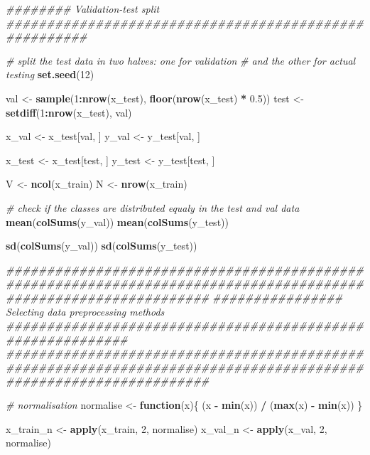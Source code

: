 \documentclass[]{article}
\newenvironment{Shaded}{\begin{snugshade}}{\end{snugshade}}
\newcommand{\CommentTok}[1]{\textcolor[rgb]{0.56,0.35,0.01}{\textit{#1}}}
\newcommand{\ControlFlowTok}[1]{\textcolor[rgb]{0.13,0.29,0.53}{\textbf{#1}}}
\newcommand{\DecValTok}[1]{\textcolor[rgb]{0.00,0.00,0.81}{#1}}
\newcommand{\FloatTok}[1]{\textcolor[rgb]{0.00,0.00,0.81}{#1}}
\newcommand{\KeywordTok}[1]{\textcolor[rgb]{0.13,0.29,0.53}{\textbf{#1}}}
\newcommand{\NormalTok}[1]{#1}
\newcommand{\OperatorTok}[1]{\textcolor[rgb]{0.81,0.36,0.00}{\textbf{#1}}}
\newcommand{\StringTok}[1]{\textcolor[rgb]{0.31,0.60,0.02}{#1}}
\begin{document}
\begin{Shaded}
\begin{Highlighting}[]
{\CommentTok{######## Validation-test split ######################################################}

\CommentTok{# split the test data in two halves: one for validation}
\CommentTok{# and the other for actual testing}
\KeywordTok{set.seed}\NormalTok{(}\DecValTok{12}\NormalTok{)}

\NormalTok{val <-}\StringTok{ }\KeywordTok{sample}\NormalTok{(}\DecValTok{1}\OperatorTok{:}\KeywordTok{nrow}\NormalTok{(x_test), }\KeywordTok{floor}\NormalTok{(}\KeywordTok{nrow}\NormalTok{(x_test) }\OperatorTok{*}\StringTok{ }\FloatTok{0.5}\NormalTok{)) }
\NormalTok{test <-}\StringTok{ }\KeywordTok{setdiff}\NormalTok{(}\DecValTok{1}\OperatorTok{:}\KeywordTok{nrow}\NormalTok{(x_test), val) }

\NormalTok{x_val <-}\StringTok{ }\NormalTok{x_test[val, ]}
\NormalTok{y_val <-}\StringTok{ }\NormalTok{y_test[val, ]}

\NormalTok{x_test <-}\StringTok{ }\NormalTok{x_test[test, ]}
\NormalTok{y_test <-}\StringTok{ }\NormalTok{y_test[test, ]}

\NormalTok{V <-}\StringTok{ }\KeywordTok{ncol}\NormalTok{(x_train)}
\NormalTok{N <-}\StringTok{ }\KeywordTok{nrow}\NormalTok{(x_train)}

\CommentTok{# check if the classes are distributed equaly in the test and val data}
\KeywordTok{mean}\NormalTok{(}\KeywordTok{colSums}\NormalTok{(y_val))}
\KeywordTok{mean}\NormalTok{(}\KeywordTok{colSums}\NormalTok{(y_test))}

\KeywordTok{sd}\NormalTok{(}\KeywordTok{colSums}\NormalTok{(y_val))}
\KeywordTok{sd}\NormalTok{(}\KeywordTok{colSums}\NormalTok{(y_test))}

\CommentTok{#################################################################################################################}
\CommentTok{################ Selecting data preprocessing methods ###########################################################}
\CommentTok{#################################################################################################################}

\CommentTok{# normalisation}
\NormalTok{normalise <-}\StringTok{ }\ControlFlowTok{function}\NormalTok{(x)\{}
\NormalTok{  (x }\OperatorTok{-}\StringTok{ }\KeywordTok{min}\NormalTok{(x)) }\OperatorTok{/}\StringTok{ }\NormalTok{(}\KeywordTok{max}\NormalTok{(x) }\OperatorTok{-}\StringTok{ }\KeywordTok{min}\NormalTok{(x))}
\NormalTok{\}}

\NormalTok{x_train_n <-}\StringTok{ }\KeywordTok{apply}\NormalTok{(x_train, }\DecValTok{2}\NormalTok{, normalise)}
\NormalTok{x_val_n <-}\StringTok{ }\KeywordTok{apply}\NormalTok{(x_val, }\DecValTok{2}\NormalTok{, normalise)}

}
\end{Highlighting}
\end{Shaded}
\end{document}
